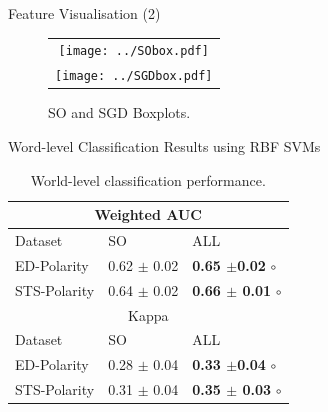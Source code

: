 \documentclass[handout]{beamer}
\begin{document}
\begin{frame}{Feature Visualisation (2)}
\begin{scriptsize}
\begin{figure}[ht]
\begin{center}
\begin{tabular}{c}
\texttt{[image: ../SObox.pdf]}\\
\texttt{[image: ../SGDbox.pdf]}
\end{tabular}
\caption{SO and SGD  Boxplots.}
\label{fig:box}
\end{center}
\end{figure} 
\end{scriptsize}
\end{frame}




\begin{frame}{Word-level Classification Results using RBF SVMs}
\footnotesize
\begin{table}[!htb]
\begin{center}
\begin{tabular}{l|l|l}
\hline \hline
\multicolumn{ 3}{c}{Weighted AUC } \\ \hline \hline
Dataset & SO & ALL \\ \hline
ED-Polarity & 0.62 $\pm$ 0.02 &  \textbf{0.65 $\pm$0.02} $\circ$ \\ 
STS-Polarity & 0.64 $\pm$ 0.02 & \textbf{0.66 $\pm$ 0.01} $\circ$   \\ \hline 
\hline \hline
\multicolumn{ 3}{c}{Kappa} \\ \hline \hline
Dataset & SO & ALL \\ \hline
ED-Polarity & 0.28 $\pm$ 0.04 &  \textbf{0.33 $\pm$0.04} $\circ$ \\ 
STS-Polarity & 0.31 $\pm$ 0.04 & \textbf{0.35 $\pm$ 0.03} $\circ$   \\ \hline 


\end{tabular}
\end{center}
\caption{World-level classification performance.} 
\label{tab:classres}
\end{table}


\end{frame}
\end{document}
